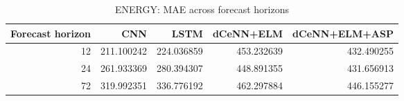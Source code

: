 \begin{table}
\caption{ENERGY: MAE across forecast horizons}
\begin{tabular}{rrrrr}
\toprule
Forecast horizon & CNN & LSTM & dCeNN+ELM & dCeNN+ELM+ASP \\
\midrule
12 & 211.100242 & 224.036859 & 453.232639 & 432.490255 \\
24 & 261.933369 & 280.394307 & 448.891355 & 431.656913 \\
72 & 319.992351 & 336.776192 & 462.297884 & 446.155277 \\
\bottomrule
\end{tabular}
\end{table}
